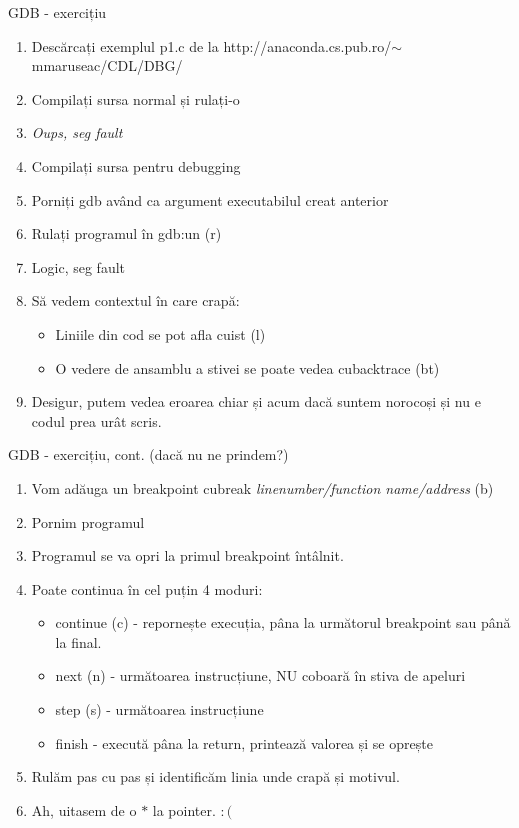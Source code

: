 \documentclass{beamer}
\begin{document}
\begin{frame}{GDB - exercițiu}
\begin{enumerate}
\item Descărcați exemplul p1.c de la http://anaconda.cs.pub.ro/$\sim$mmaruseac/CDL/DBG/
\item Compilați sursa normal și rulați-o
\item \pause \textit{Oups, seg fault}
\item \pause Compilați sursa pentru debugging
\item Porniți gdb având ca argument executabilul creat anterior
\item \pause Rulați programul în gdb:un (r)
\item \pause Logic, seg fault
\item \pause Să vedem contextul în care crapă:
\begin{itemize}
\item Liniile din cod se pot afla cuist (l)
\item O vedere de ansamblu a stivei se poate vedea cu\linebreak backtrace (bt)
\end{itemize}
\item Desigur, putem vedea eroarea chiar și acum dacă suntem norocoși și nu e codul prea urât scris.
\end{enumerate}
\end{frame}

\begin{frame}{GDB - exercițiu, cont. (dacă nu ne prindem?)}
\begin{enumerate}
\item Vom adăuga un breakpoint cu\linebreak break \textit{linenumber/function name/address} (b)
\item \pause Pornim programul 
\item \pause Programul se va opri la primul breakpoint întâlnit.
\item \pause Poate continua în cel puțin 4 moduri:
\begin{itemize}
\item continue (c) - repornește execuția, pâna la următorul breakpoint sau până la final.
\item next (n) - următoarea instrucțiune, NU coboară în stiva de apeluri
\item step (s) - următoarea instrucțiune
\item finish - execută pâna la return, printează valorea și se oprește
\end{itemize}
\item \pause Rulăm pas cu pas și identificăm linia unde crapă și motivul.
\item \pause Ah, uitasem de o $*$ la pointer. $:($
\end{enumerate}
\end{frame}
\end{document}
